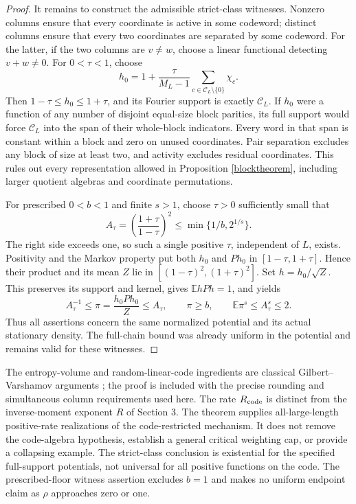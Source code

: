\documentclass[11pt]{article}
\newcommand{\E}{\mathbb E}
\begin{document}
\begin{proof}
It remains to construct the admissible strict-class witnesses. Nonzero columns ensure that every coordinate is active in some codeword; distinct columns ensure that every two coordinates are separated by some codeword. For the latter, if the two columns are $v\ne w$, choose a linear functional detecting $v+w\ne0$.
For $0<\tau<1$, choose
\[
 h_0=1+\frac{\tau}{M_L-1}\sum_{c\in\mathcal C_L\setminus\{0\}}\chi_c.
\]
Then $1-\tau\leq h_0\leq1+\tau$, and its Fourier support is exactly $\mathcal C_L$. If $h_0$ were a function of any number of disjoint equal-size block parities, its full support would force $\mathcal C_L$ into the span of their whole-block indicators. Every word in that span is constant within a block and zero on unused coordinates. Pair separation excludes any block of size at least two, and activity excludes residual coordinates. This rules out every representation allowed in Proposition \ref{blocktheorem}, including larger quotient algebras and coordinate permutations.

For prescribed $0<b<1$ and finite $s>1$, choose $\tau>0$ sufficiently small that
\[
 A_\tau=\left(\frac{1+\tau}{1-\tau}\right)^2
 \leq\min\{1/b,2^{1/s}\}.
\]
The right side exceeds one, so such a single positive $\tau$, independent of $L$, exists. Positivity and the Markov property put both $h_0$ and $Ph_0$ in $[1-\tau,1+\tau]$. Hence their product and its mean $Z$ lie in $[(1-\tau)^2,(1+\tau)^2]$. Set $h=h_0/\sqrt Z$. This preserves its support and kernel, gives $\E hPh=1$, and yields
\[
 A_\tau^{-1}\leq \pi=\frac{h_0Ph_0}{Z}\leq A_\tau,
 \qquad \pi\geq b,\qquad \E\pi^s\leq A_\tau^s\leq2.
\]
Thus all assertions concern the same normalized potential and its actual stationary density. The full-chain bound was already uniform in the potential and remains valid for these witnesses.
\end{proof}

The entropy-volume and random-linear-code ingredients are classical Gilbert--Varshamov arguments \cite{guruswami}; the proof is included with the precise rounding and simultaneous column requirements used here. The rate $R_{\rm code}$ is distinct from the inverse-moment exponent $R$ of Section 3. The theorem supplies all-large-length positive-rate realizations of the code-restricted mechanism. It does not remove the code-algebra hypothesis, establish a general critical weighting cap, or provide a collapsing example. The strict-class conclusion is existential for the specified full-support potentials, not universal for all positive functions on the code. The prescribed-floor witness assertion excludes $b=1$ and makes no uniform endpoint claim as $\rho$ approaches zero or one.
\end{document}
